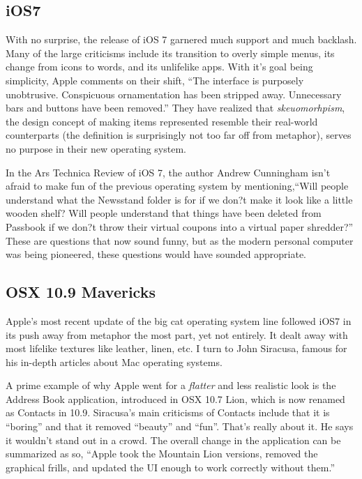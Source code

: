 \documentclass[11pt, oneside]{article}   	%
\begin{document}
\subsection{iOS7}
With no surprise, the release of iOS 7 garnered much support and much backlash. Many of the large criticisms include its transition to overly simple menus, its change from icons to words, and its unlifelike apps. With it's goal being simplicity, Apple comments on their shift, ``The interface is purposely unobtrusive. Conspicuous ornamentation has been stripped away. Unnecessary bars and buttons have been removed.'' \cite{apple-design} They have realized that \textit{skeuomorhpism}, the design concept of making items represented resemble their real-world counterparts (the definition is surprisingly not too far off from metaphor), serves no purpose in their new operating system.

In the Ars Technica Review of iOS 7, the author Andrew Cunningham isn't afraid to make fun of the previous operating system by mentioning,``Will people understand what the Newsstand folder is for if we don?t make it look like a little wooden shelf? Will people understand that things have been deleted from Passbook if we don?t throw their virtual coupons into a virtual paper shredder?'' \cite{ars-technica-iOS7} These are questions that now sound funny, but as the modern personal computer was being pioneered, these questions would have sounded appropriate.

\subsection{OSX 10.9 Mavericks}
Apple's most recent update of the big cat operating system line followed iOS7 in its push away from metaphor the most part, yet not entirely. It dealt away with most lifelike textures like leather, linen, etc. I turn to John Siracusa, famous for his in-depth articles about Mac operating systems.

A prime example of why Apple went for a \textit{flatter} and less realistic look is the Address Book application, introduced in OSX 10.7 Lion, which is now renamed as Contacts in 10.9. Siracusa's main criticisms of Contacts include that it is ``boring'' and that it removed ``beauty'' and ``fun''. That's really about it. He says it wouldn't stand out in a crowd. The overall change in the application can be summarized as so, ``Apple took the Mountain Lion versions, removed the graphical frills, and updated the UI enough to work correctly without them.'' \cite{ars-technica-mavericks} 
\end{document}
